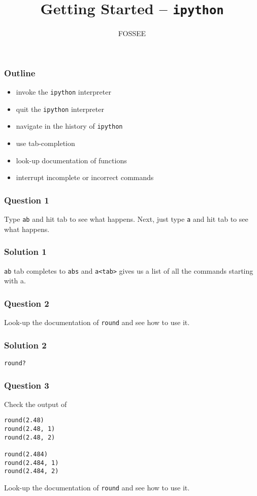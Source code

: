 \documentclass[presentation]{beamer}
\title{Getting Started -- \texttt{ipython}}
\author{FOSSEE}
\date{}
\begin{document}
\maketitle









\begin{frame}
\frametitle{Outline}
\label{sec-1}

\begin{itemize}
\item invoke the \texttt{ipython} interpreter
\item quit the \texttt{ipython} interpreter
\item navigate in the history of \texttt{ipython}
\item use tab-completion
\item look-up documentation of functions
\item interrupt incomplete or incorrect commands
\end{itemize}
\end{frame}
\begin{frame}
\frametitle{Question 1}
\label{sec-2}

  Type \texttt{ab} and hit tab to see what happens. Next, just type \texttt{a} and
  hit tab to see what happens.
\end{frame}
\begin{frame}
\frametitle{Solution 1}
\label{sec-3}

  \texttt{ab} tab completes to \texttt{abs} and \texttt{a<tab>} gives us a list of all the
  commands starting with a.
\end{frame}
\begin{frame}
\frametitle{Question 2}
\label{sec-4}

  Look-up the documentation of \texttt{round} and see how to use it.
\end{frame}
\begin{frame}
\frametitle{Solution 2}
\label{sec-5}

  \texttt{round?}
\end{frame}
\begin{frame}[fragile]
\frametitle{Question 3}
\label{sec-6}

  Check the output of
\lstset{language=Python}
\begin{lstlisting}
round(2.48)
round(2.48, 1)
round(2.48, 2)

round(2.484)
round(2.484, 1)
round(2.484, 2)
\end{lstlisting}
  Look-up the documentation of \texttt{round} and see how to use it.
\end{frame}
\end{document}
